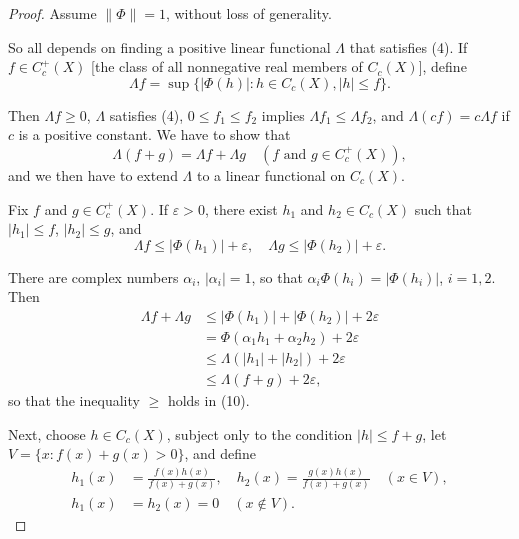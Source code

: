 \begin{proof}
  Assume $\|\Phi\| = 1$, without loss of generality.

  So all depends on finding a positive linear functional $\Lambda$ that satisfies (4). If $f \in C_c^+(X)$ [the class of all nonnegative real members of $C_c(X)$], define
  \begin{equation}
    \Lambda f = \sup \{|\Phi(h)| : h \in C_c(X), |h| \leq f\}. \tag{9}
  \end{equation}

  Then $\Lambda f \geq 0$, $\Lambda$ satisfies (4), $0 \leq f_1 \leq f_2$ implies $\Lambda f_1 \leq \Lambda f_2$, and $\Lambda(cf) = c\Lambda f$ if $c$ is a positive constant. We have to show that
  \begin{equation}
    \Lambda(f + g) = \Lambda f + \Lambda g \quad (f \text{ and } g \in C_c^+(X)), \tag{10}
  \end{equation}
  and we then have to extend $\Lambda$ to a linear functional on $C_c(X)$.

  Fix $f$ and $g \in C_c^+(X)$. If $\varepsilon > 0$, there exist $h_1$ and $h_2 \in C_c(X)$ such that $|h_1| \leq f$, $|h_2| \leq g$, and
  \begin{equation}
    \Lambda f \leq |\Phi(h_1)| + \varepsilon, \quad \Lambda g \leq |\Phi(h_2)| + \varepsilon. \tag{11}
  \end{equation}

  There are complex numbers $\alpha_i$, $|\alpha_i| = 1$, so that $\alpha_i \Phi(h_i) = |\Phi(h_i)|$, $i = 1, 2$. Then
  \begin{align}
    \Lambda f + \Lambda g & \leq |\Phi(h_1)| + |\Phi(h_2)| + 2\varepsilon      \\
                          & = \Phi(\alpha_1 h_1 + \alpha_2 h_2) + 2\varepsilon \\
                          & \leq \Lambda(|h_1| + |h_2|) + 2\varepsilon         \\
                          & \leq \Lambda(f + g) + 2\varepsilon,
  \end{align}
  so that the inequality $\geq$ holds in (10).

  Next, choose $h \in C_c(X)$, subject only to the condition $|h| \leq f + g$, let $V = \{x : f(x) + g(x) > 0\}$, and define
  \begin{align}
    h_1(x) & = \frac{f(x)h(x)}{f(x) + g(x)}, \quad h_2(x) = \frac{g(x)h(x)}{f(x) + g(x)} \quad (x \in V), \tag{12} \\
    h_1(x) & = h_2(x) = 0 \quad (x \notin V).
  \end{align}


\end{proof}
